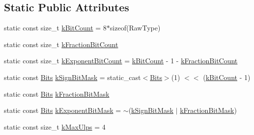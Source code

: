 \subsection*{Static Public Attributes}
\begin{DoxyCompactItemize}
\item 
static const size\-\_\-t \hyperlink{classtesting_1_1internal_1_1FloatingPoint_ab819d2e8f93e9e482373999f0f8d71b9}{k\-Bit\-Count} = 8$\ast$sizeof(Raw\-Type)
\item 
static const size\-\_\-t \hyperlink{classtesting_1_1internal_1_1FloatingPoint_a0b756a6d2a4f5f5b41ca79651c06c043}{k\-Fraction\-Bit\-Count}
\item 
static const size\-\_\-t \hyperlink{classtesting_1_1internal_1_1FloatingPoint_a1973d843c00781053d3073daa8a40119}{k\-Exponent\-Bit\-Count} = \hyperlink{classtesting_1_1internal_1_1FloatingPoint_ab819d2e8f93e9e482373999f0f8d71b9}{k\-Bit\-Count} -\/ 1 -\/ \hyperlink{classtesting_1_1internal_1_1FloatingPoint_a0b756a6d2a4f5f5b41ca79651c06c043}{k\-Fraction\-Bit\-Count}
\item 
static const \hyperlink{classtesting_1_1internal_1_1FloatingPoint_abf228bf6cd48f12c8b44c85b4971a731}{Bits} \hyperlink{classtesting_1_1internal_1_1FloatingPoint_aca98b5ea6f2222a66a82e52421682efa}{k\-Sign\-Bit\-Mask} = static\-\_\-cast$<$\hyperlink{classtesting_1_1internal_1_1FloatingPoint_abf228bf6cd48f12c8b44c85b4971a731}{Bits}$>$(1) $<$$<$ (\hyperlink{classtesting_1_1internal_1_1FloatingPoint_ab819d2e8f93e9e482373999f0f8d71b9}{k\-Bit\-Count} -\/ 1)
\item 
static const \hyperlink{classtesting_1_1internal_1_1FloatingPoint_abf228bf6cd48f12c8b44c85b4971a731}{Bits} \hyperlink{classtesting_1_1internal_1_1FloatingPoint_a0ac75d4ffd24f14bca452abe8a718da1}{k\-Fraction\-Bit\-Mask}
\item 
static const \hyperlink{classtesting_1_1internal_1_1FloatingPoint_abf228bf6cd48f12c8b44c85b4971a731}{Bits} \hyperlink{classtesting_1_1internal_1_1FloatingPoint_a66065dfc4d5f41100f686159637af23b}{k\-Exponent\-Bit\-Mask} = $\sim$(\hyperlink{classtesting_1_1internal_1_1FloatingPoint_aca98b5ea6f2222a66a82e52421682efa}{k\-Sign\-Bit\-Mask} $\vert$ \hyperlink{classtesting_1_1internal_1_1FloatingPoint_a0ac75d4ffd24f14bca452abe8a718da1}{k\-Fraction\-Bit\-Mask})
\item 
static const size\-\_\-t \hyperlink{classtesting_1_1internal_1_1FloatingPoint_aac498b3714d93f8e88cdc30e4c5935f6}{k\-Max\-Ulps} = 4
\end{DoxyCompactItemize}


